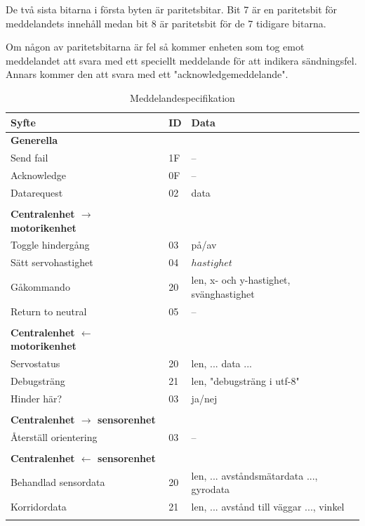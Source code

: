 \documentclass[a4paper,titlepage,12pt]{article}
\begin{document}
	De två sista bitarna i första byten är paritetsbitar. Bit 7 är en  paritetsbit
	för meddelandets innehåll medan bit 8 är paritetsbit för de 7 tidigare bitarna.

	Om någon av paritetsbitarna är fel så kommer enheten som tog emot meddelandet att svara
	med ett speciellt meddelande för att indikera sändningsfel. Annars kommer den 
	att svara med ett "acknowledgemeddelande".

    \newpage
	\begin{longtable}[c]{ l l l }
		\textbf{Syfte} & \textbf{ID} & \textbf{Data} \\ \midrule
		\textbf{Generella} \\ \midrule
		Send fail & 1F & -- \\ \midrule
		Acknowledge & 0F & -- \\ \midrule
		Datarequest & 02 & data \\ \midrule
		\\
		\textbf{Centralenhet $ \to $ motorikenhet}\\ \midrule
		Toggle hindergång & 03 & på/av \\ \midrule
		Sätt servohastighet & 04 & $ hastighet $ \\ \midrule
		Gåkommando &  20 & len, x- och y-hastighet, svänghastighet \\ \midrule
		Return to neutral & 05 & -- \\ \midrule
		\\
		\textbf{Centralenhet $ \gets $ motorikenhet}\\ \midrule
		Servostatus & 20 & len, ... data ... \\ \midrule
		Debugsträng & 21 & len, "debugsträng i utf-8" \\ \midrule
		Hinder här? & 03 & ja/nej \\ \midrule
		\\
		\textbf{Centralenhet $\to$ sensorenhet} \\ \midrule
		Återställ orientering & 03 & -- \\ \midrule
		\\
		\textbf{Centralenhet $ \gets $ sensorenhet}\\ \midrule
		Behandlad sensordata & 20 & len, ... avståndsmätardata ..., gyrodata \\ \midrule
		Korridordata		 & 21 & len, ... avstånd till väggar ..., vinkel \\

		\caption{Meddelandespecifikation \label{table:messages}}
	\end{longtable}
\end{document}

